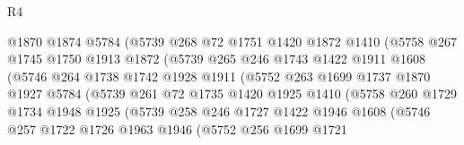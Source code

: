 \begin{lexlean}{R4}
\begin{coremodule}
                        @1870
                        @1874
                        @5784
                        (@5739
                          @268
                          @72
                          @1751
                          @1420
                          @1872
                          @1410
                          (@5758
                            @267
                            @1745
                            @1750
                            @1913
                            @1872
                            (@5739
                              @265
                              @246
                              @1743
                              @1422
                              @1911
                              @1608
                              (@5746
                                @264
                                @1738
                                @1742
                                @1928
                                @1911
                                (@5752
                                  @263
                                  @1699
                                  @1737
                                  @1870
                                  @1927
                                  @5784
                                  (@5739
                                    @261
                                    @72
                                    @1735
                                    @1420
                                    @1925
                                    @1410
                                    (@5758
                                      @260
                                      @1729
                                      @1734
                                      @1948
                                      @1925
                                      (@5739
                                        @258
                                        @246
                                        @1727
                                        @1422
                                        @1946
                                        @1608
                                        (@5746
                                          @257
                                          @1722
                                          @1726
                                          @1963
                                          @1946
                                          (@5752
                                            @256
                                            @1699
                                            @1721

\end{coremodule}
\end{lexlean}

